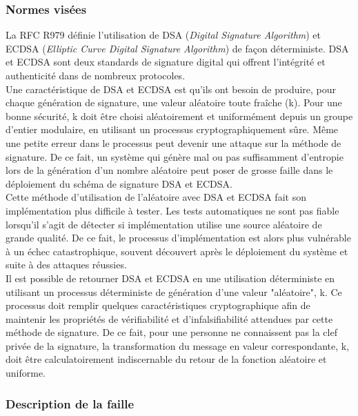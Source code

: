 		\subsubsection{Normes visées}

		La RFC R979 \cite{rfc6979} définie l'utilisation de DSA (\textit{Digital Signature Algorithm}) et ECDSA (\textit{Elliptic Curve Digital Signature Algorithm}) de façon déterministe. DSA et ECDSA sont deux standards de signature digital qui offrent l'intégrité et authenticité dans de nombreux protocoles.\\

		Une caractéristique de DSA et ECDSA est qu'ils ont besoin de produire, pour chaque génération de signature, une valeur aléatoire toute fraîche (k). Pour une bonne sécurité, k doit être choisi aléatoirement et uniformément depuis un groupe d'entier modulaire, en utilisant un processus cryptographiquement sûre. Même une petite erreur dans le processus peut devenir une attaque sur la méthode de signature. De ce fait, un système qui génère mal ou pas suffisamment d'entropie lors de la génération d'un nombre aléatoire peut poser de grosse faille dans le déploiement du schéma de signature DSA et ECDSA.\\

		Cette méthode d'utilisation de l'aléatoire avec DSA et ECDSA fait son implémentation plus difficile à tester. Les tests automatiques ne sont pas fiable lorsqu'il s'agit de détecter si implémentation utilise une source aléatoire de grande qualité. De ce fait, le processus d'implémentation est alors plus vulnérable à un échec catastrophique, souvent découvert après le déploiement du système et suite à des attaques réussies.\\

		Il est possible de retourner DSA et ECDSA en une utilisation déterministe en utilisant un processus déterministe de génération d'une valeur "aléatoire", k. Ce processus doit remplir quelques caractéristiques cryptographique afin de maintenir les propriétés de vérifiabilité et d'infalsifiabilité attendues par cette méthode de signature. De ce fait, pour une personne ne connaissent pas la clef privée de la signature, la transformation du message en valeur correspondante, k, doit être calculatoirement indiscernable du retour de la fonction aléatoire et uniforme.
		
		\subsubsection{Description de la faille}
			
